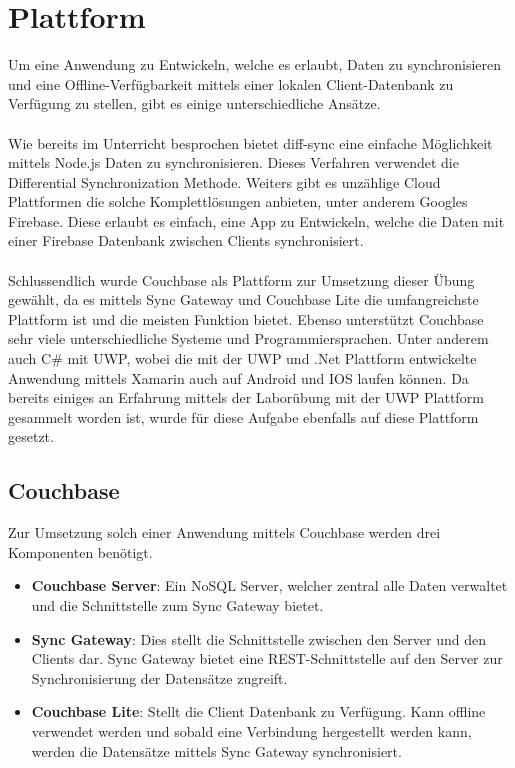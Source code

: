 
\section{Plattform}

Um eine Anwendung zu Entwickeln, welche es erlaubt, Daten zu synchronisieren und eine Offline-Verfügbarkeit mittels einer lokalen Client-Datenbank zu Verfügung zu stellen, gibt es einige unterschiedliche Ansätze.
\\\\
Wie bereits im Unterricht besprochen bietet diff-sync eine einfache Möglichkeit mittels Node.js Daten zu synchronisieren. Dieses Verfahren verwendet die Differential Synchronization Methode. \cite{nodejssync} Weiters gibt es unzählige Cloud Plattformen die solche Komplettlösungen anbieten, unter anderem Googles Firebase. Diese erlaubt es einfach, eine App zu Entwickeln, welche die Daten mit einer Firebase Datenbank zwischen Clients synchronisiert. \cite{firebase}
\\\\
Schlussendlich wurde Couchbase als Plattform zur Umsetzung dieser Übung gewählt, da es mittels Sync Gateway und Couchbase Lite die umfangreichste Plattform ist und die meisten Funktion bietet. Ebenso unterstützt Couchbase sehr viele unterschiedliche Systeme und Programmiersprachen. Unter anderem auch C\# mit UWP, wobei die mit der UWP und .Net Plattform entwickelte Anwendung mittels Xamarin auch auf Android und IOS laufen können. Da bereits einiges an Erfahrung mittels der Laborübung mit der UWP Plattform gesammelt worden ist, wurde für diese Aufgabe ebenfalls auf diese Plattform gesetzt. \cite{couchbasemobile}

\subsection{Couchbase}

Zur Umsetzung solch einer Anwendung mittels Couchbase werden drei Komponenten benötigt.

\begin{itemize}
	\item \textbf{Couchbase Server}: Ein NoSQL Server, welcher zentral alle Daten verwaltet und die Schnittstelle zum Sync Gateway bietet.
	\item \textbf{Sync Gateway}: Dies stellt die Schnittstelle zwischen den Server und den Clients dar. Sync Gateway bietet eine REST-Schnittstelle auf den Server zur Synchronisierung der Datensätze zugreift.
	\item \textbf{Couchbase Lite}: Stellt die Client Datenbank zu Verfügung. Kann offline verwendet werden und sobald eine Verbindung hergestellt werden kann, werden die Datensätze mittels Sync Gateway synchronisiert.
\end{itemize}

